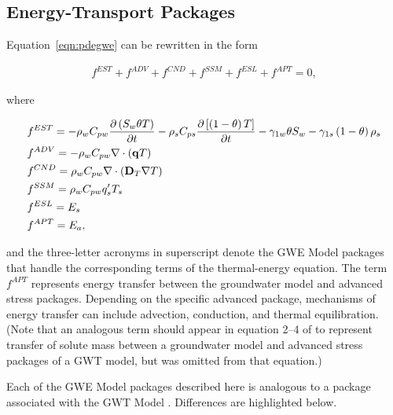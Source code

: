 \subsection{Energy-Transport Packages} \label{sec:packages}

\noindent Equation~\ref{eqn:pdegwe} can be rewritten in the form

\begin{equation}
\label{eqn:pdegwefterms}
\begin{aligned}
f^{EST} + f^{ADV} + f^{CND} + f^{SSM} + f^{ESL} + f^{APT} = 0,
\end{aligned}
\end{equation}

\noindent where

\begin{equation}
\label{eqn:fterms}
\begin{aligned}
& f^{EST} = - \rho_w C_{pw} \frac {\partial \left ( S_w \theta T \right )}{\partial t}
- \rho_s C_{ps} \frac {\partial \left [ \left (1 - \theta \right ) T \right ]}{\partial t}
- \gamma_{1w} \theta S_w - \gamma_{1s} \left (1 - \theta \right ) \rho_s \\
& f^{ADV} = - \rho_w C_{pw} \nabla \cdot \left ( \mathbf{q} T  \right ) \\
& f^{CND} =  \rho_w C_{pw} \nabla \cdot \left ( \mathbf{D}_T \nabla T \right ) \\
& f^{SSM} = \rho_w C_{pw} q'_s T_s \\
& f^{ESL} = E_s \\
& f^{APT} = E_a,
\end{aligned}
\end{equation}

\noindent and the three-letter acronyms in superscript denote the GWE Model packages that handle the corresponding terms of the thermal-energy equation. The term $ f^{APT}$ represents energy transfer between the groundwater model and advanced stress packages. Depending on the specific advanced package, mechanisms of energy transfer can include advection, conduction, and thermal equilibration. (Note that an analogous term should appear in equation 2--4 of \cite{modflow6gwt} to represent transfer of solute mass between a groundwater model and advanced stress packages of a GWT model, but was omitted from that equation.)

Each of the GWE Model packages described here is analogous to a package associated with the GWT Model \citep{modflow6gwt}. Differences are highlighted below.

